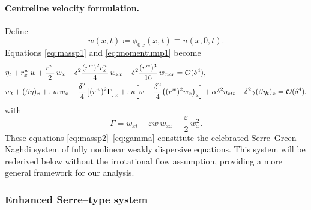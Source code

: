 \documentclass[alpha-refs, 12pt]{wiley-article}
\renewcommand{\O}{\mathcal{O}}
\begin{document}
\paragraph{Centreline velocity formulation.} Define
\[
  w(x,t)\coloneqq\phi_{0\,x}(x,t) \equiv u(x,0,t).
\]
Equations \eqref{eq:massp1} and \eqref{eq:momentump1} become
\begin{align}
  &\eta_{t}
   +r^{w}_{x}\,w
   +\frac{r^{w}}{2}\,w_{x}
   -\delta^{2}\frac{(r^{w})^{2}r^{w}_{x}}{4}\,w_{xx}
   -\delta^{2}\frac{(r^{w})^{3}}{16}\,w_{xxx}
   =\O(\delta^{4}),\label{eq:massp2}\\
  &w_{t}+(\beta\eta)_{x}
   +\varepsilon w\,w_{x}
   -\frac{\delta^{2}}{4}\bigl[(r^{w})^{2}\Gamma\bigr]_{x}
   +\varepsilon\kappa
      \Bigl[w-\frac{\delta^{2}}{4}\bigl((r^{w})^{2}w_{x}\bigr)_{x}\Bigr]
   +\alpha\delta^{2}\eta_{x t t}
   +\delta^{2}\gamma(\beta\eta_{t})_{x}
   = \O(\delta^{4}),\label{eq:momentump2}
\end{align}
with
\begin{equation}\label{eq:gamma}
  \Gamma=w_{x t}
         +\varepsilon w\,w_{xx}
         -\frac{\varepsilon}{2}\,w_{x}^{2}.
\end{equation}
These equations \eqref{eq:massp2}--\eqref{eq:gamma} constitute the celebrated Serre--Green--Naghdi system of fully nonlinear weakly dispersive equations. This system will be rederived below without the irrotational flow assumption, providing a more general framework for our analysis.

\subsubsection{Enhanced Serre–type system}\label{sec:cbsys}
\end{document}
